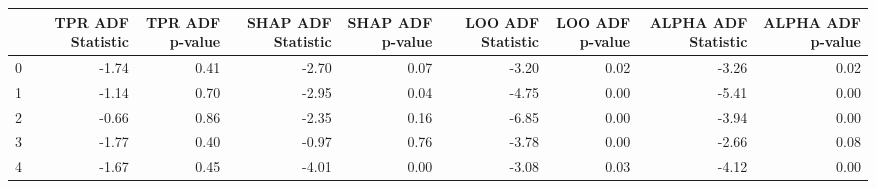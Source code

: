 \begin{tabular}{lrrrrrrrr}
\toprule
 & TPR ADF Statistic & TPR ADF p-value & SHAP ADF Statistic & SHAP ADF p-value & LOO ADF Statistic & LOO ADF p-value & ALPHA ADF Statistic & ALPHA ADF p-value \\
\midrule
0 & -1.74 & 0.41 & -2.70 & 0.07 & -3.20 & 0.02 & -3.26 & 0.02 \\
1 & -1.14 & 0.70 & -2.95 & 0.04 & -4.75 & 0.00 & -5.41 & 0.00 \\
2 & -0.66 & 0.86 & -2.35 & 0.16 & -6.85 & 0.00 & -3.94 & 0.00 \\
3 & -1.77 & 0.40 & -0.97 & 0.76 & -3.78 & 0.00 & -2.66 & 0.08 \\
4 & -1.67 & 0.45 & -4.01 & 0.00 & -3.08 & 0.03 & -4.12 & 0.00 \\
\bottomrule
\end{tabular}
